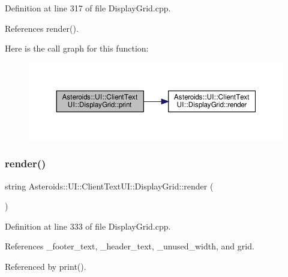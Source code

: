 Definition at line 317 of file Display\+Grid.\+cpp.



References render().

Here is the call graph for this function\+:\nopagebreak
\begin{figure}[H]
\begin{center}
\leavevmode
\includegraphics[width=350pt]{classAsteroids_1_1UI_1_1ClientTextUI_1_1DisplayGrid_a1be310d6b569c5abee1299a1a50ce7cb_cgraph}
\end{center}
\end{figure}
\mbox{\label{classAsteroids_1_1UI_1_1ClientTextUI_1_1DisplayGrid_a72317ad63490f1041543c51b21da527e}} 
\subsubsection{\texorpdfstring{render()}{render()}}
{\footnotesize\ttfamily string Asteroids\+::\+U\+I\+::\+Client\+Text\+U\+I\+::\+Display\+Grid\+::render (\begin{DoxyParamCaption}{ }\end{DoxyParamCaption})}



Definition at line 333 of file Display\+Grid.\+cpp.



References \+\_\+footer\+\_\+text, \+\_\+header\+\_\+text, \+\_\+unused\+\_\+width, and grid.



Referenced by print().

